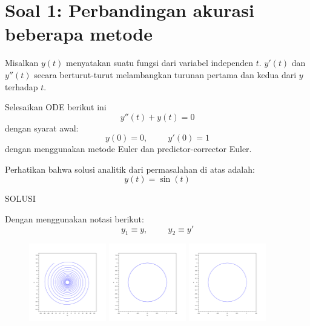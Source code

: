 \section{Soal 1: Perbandingan akurasi beberapa metode}

Misalkan $y(t)$ menyatakan suatu fungsi dari variabel independen $t$.
$y'(t)$ dan $y''(t)$ secara berturut-turut melambangkan turunan pertama dan
kedua dari $y$ terhadap $t$.

Selesaikan ODE berikut ini
\begin{equation}
y''(t) + y(t) = 0
\end{equation}
dengan syarat awal:
\begin{equation}
y(0) = 0, \hspace{1cm} y'(0) = 1
\end{equation}
dengan menggunakan metode Euler dan predictor-corrector Euler.

Perhatikan bahwa solusi analitik dari permasalahan di atas adalah:
\begin{equation}
y(t) = \sin(t)
\end{equation}

SOLUSI

Dengan menggunakan notasi berikut:
\begin{equation}
y_1 \equiv y, \hspace{1cm} y_2 \equiv y'
\end{equation}

\begin{figure}[H]
\centering
\includegraphics[width=0.3\textwidth]{images/soal_01_ode_euler_y1_y2.pdf}
\includegraphics[width=0.3\textwidth]{images/soal_01_ode_euler_PC_y1_y2.pdf}
\includegraphics[width=0.3\textwidth]{images/soal_01_ode_RK4_y1_y2.pdf}
\par
\end{figure}

